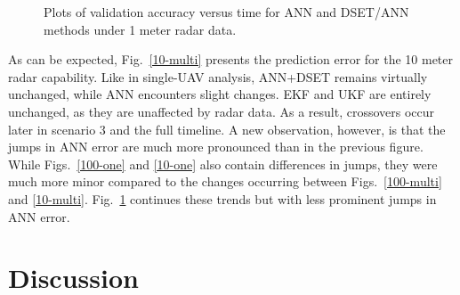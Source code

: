 \documentclass[12pt]{uthesis-v12}  %
\begin{document}
\begin{figure}
	\hfill	
{}
						
\caption{Plots of validation accuracy versus time for ANN and DSET/ANN methods under 1 meter radar data.}
	\label{1-multi}
	\end{figure}	
	
As can be expected, Fig.~\ref{10-multi} presents the prediction error for the 10 meter radar capability. Like in single-UAV analysis, ANN+DSET remains virtually unchanged, while ANN encounters slight changes. EKF and UKF are entirely unchanged, as they are unaffected by radar data. As a result, crossovers occur later in scenario 3 and the full timeline. A new observation, however, is that the jumps in ANN error are much more pronounced than in the previous figure. While Figs.~\ref{100-one} and \ref{10-one} also contain differences in jumps, they were much more minor compared to the changes occurring between Figs.~\ref{100-multi} and \ref{10-multi}. Fig.~\ref{1-multi} continues these trends but with less prominent jumps in ANN error.
	
\section{Discussion}
\label{disc}	
\end{document}
